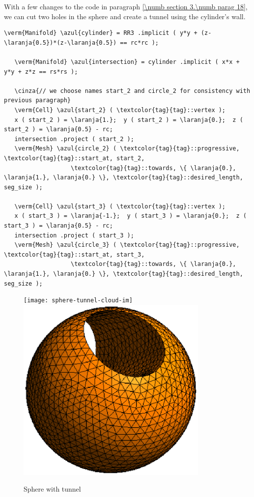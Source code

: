 With a few changes to the code in paragraph \ref{\numb section 3.\numb parag 18},
we can cut two holes in the sphere and create a tunnel using the cylinder's wall.
\medskip

\begin{Verbatim}[commandchars=\\\{\},formatcom=\small\tt,frame=single,
   label=parag-\ref{\numb section 3.\numb parag 19}.cpp,rulecolor=\color{coment},
   baselinestretch=0.94,framesep=2mm                                            ]
   \verm{Manifold} \azul{cylinder} = RR3 .implicit ( y*y + (z-\laranja{0.5})*(z-\laranja{0.5}) == rc*rc );

   \verm{Manifold} \azul{intersection} = cylinder .implicit ( x*x + y*y + z*z == rs*rs );

   \cinza{// we choose names start_2 and circle_2 for consistency with previous paragraph}
   \verm{Cell} \azul{start_2} ( \textcolor{tag}{tag}::vertex );
   x ( start_2 ) = \laranja{1.};  y ( start_2 ) = \laranja{0.};  z ( start_2 ) = \laranja{0.5} - rc;
   intersection .project ( start_2 );
   \verm{Mesh} \azul{circle_2} ( \textcolor{tag}{tag}::progressive, \textcolor{tag}{tag}::start_at, start_2,
                   \textcolor{tag}{tag}::towards, \{ \laranja{0.}, \laranja{1.}, \laranja{0.} \}, \textcolor{tag}{tag}::desired_length, seg_size );

   \verm{Cell} \azul{start_3} ( \textcolor{tag}{tag}::vertex );
   x ( start_3 ) = \laranja{-1.};  y ( start_3 ) = \laranja{0.};  z ( start_3 ) = \laranja{0.5} - rc;
   intersection .project ( start_3 );
   \verm{Mesh} \azul{circle_3} ( \textcolor{tag}{tag}::progressive, \textcolor{tag}{tag}::start_at, start_3,
                   \textcolor{tag}{tag}::towards, \{ \laranja{0.}, \laranja{1.}, \laranja{0.} \}, \textcolor{tag}{tag}::desired_length, seg_size );
\end{Verbatim}

\begin{figure}[ht] \centering
\if{}
 \texttt{[image: sphere-tunnel-cloud-im]}
\else
 \includegraphics[width=94mm]{sphere-tunnel-low-res}
\fi
  \caption{Sphere with tunnel}
  \label{\numb section 3.\numb fig 7}
\end{figure}

